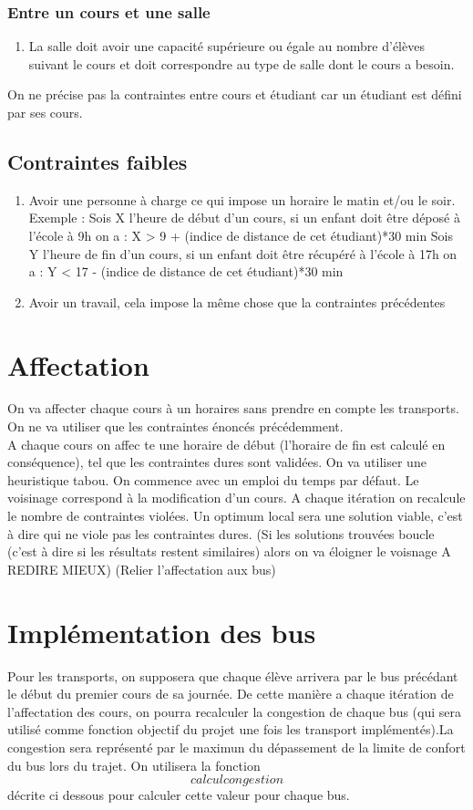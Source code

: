 \documentclass[a4paper,11pt]{article}
\begin{document}
			\subsubsection{Entre un cours et une salle}
				\begin{enumerate}
					\item 	La salle doit avoir une capacité supérieure ou égale au nombre d'élèves suivant le cours et doit correspondre au type de salle dont le cours a besoin.
				\end{enumerate}
	On ne précise pas la contraintes entre cours et étudiant car un étudiant est défini par ses cours.
	\subsection{Contraintes faibles}
		\begin{enumerate}
			\item Avoir une personne à charge ce qui impose un horaire le matin et/ou le soir.
			Exemple : Sois X l'heure de début d'un cours, si un enfant doit être déposé à l'école à 9h on a : X > 9 + (indice de distance de cet étudiant)*30 min
			Sois Y l'heure de fin d'un cours, si un enfant doit être récupéré à l'école à 17h on a : Y < 17 - (indice de distance de cet étudiant)*30 min
			\item Avoir un travail, cela impose la même chose que la contraintes précédentes
		\end{enumerate}
\section{Affectation}
	On va affecter chaque cours à un horaires sans prendre en compte les transports. On ne va utiliser que les contraintes énoncés précédemment. \\
	A chaque cours on affec		te une horaire de début (l'horaire de fin est calculé en conséquence), tel que les contraintes dures sont validées.
	On va utiliser une heuristique tabou. On commence avec un emploi du temps par défaut. Le voisinage correspond à la modification d'un cours. A chaque itération on recalcule le nombre de contraintes violées. Un optimum local sera une solution viable, c'est à dire qui ne viole pas les contraintes dures.
	(Si les solutions trouvées boucle (c'est à dire si les résultats restent similaires) alors on va éloigner le voisnage A REDIRE MIEUX)
	(Relier l'affectation aux bus)	
\section{Implémentation des bus}
	Pour les transports, on supposera que chaque élève arrivera par le bus précédant le début du premier cours de sa journée. 
	De cette manière a chaque itération de l'affectation des cours, on pourra recalculer la congestion de chaque bus
	(qui sera utilisé comme fonction objectif du projet une fois les transport implémentés).La congestion sera représenté par le maximun du dépassement de la limite de confort du bus lors du trajet.
	On utilisera la fonction $$calcul congestion$$ décrite ci dessous pour calculer cette valeur pour chaque bus.
	
\end{document}
